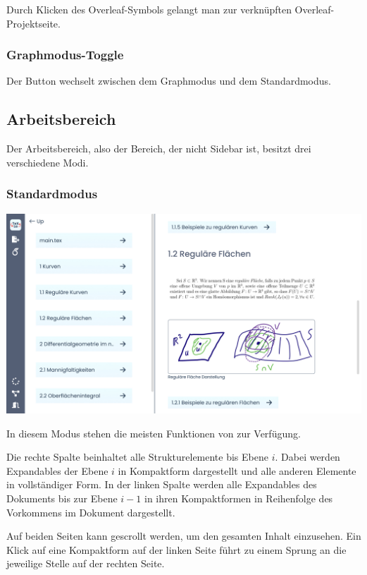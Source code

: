 Durch Klicken des Overleaf-Symbols gelangt man zur verknüpften Overleaf-Projektseite.

\subsubsection{Graphmodus-Toggle}

Der Button wechselt zwischen dem Graphmodus und dem Standardmodus.

\subsection{Arbeitsbereich}
\label{subsec:arbeitsbereich}

Der Arbeitsbereich, also der Bereich, der nicht Sidebar ist, besitzt drei verschiedene Modi.

\subsubsection{Standardmodus}

\begin{minipage}{\linewidth}
  \includegraphics[width=\textwidth]{assets/img/Standardansicht}
\end{minipage}

In diesem Modus stehen die meisten Funktionen von \texla{} zur Verfügung.

Die rechte Spalte beinhaltet alle Strukturelemente bis Ebene $i$.
Dabei werden Expandables der Ebene $i$ in Kompaktform dargestellt und alle anderen Elemente in vollständiger Form.
In der linken Spalte werden alle Expandables des Dokuments bis zur Ebene $i-1$ in ihren Kompaktformen in
Reihenfolge des Vorkommens im Dokument dargestellt.

Auf beiden Seiten kann gescrollt werden, um den gesamten Inhalt einzusehen.
Ein Klick auf eine Kompaktform auf der linken Seite führt zu einem Sprung an die jeweilige Stelle auf der rechten Seite.

